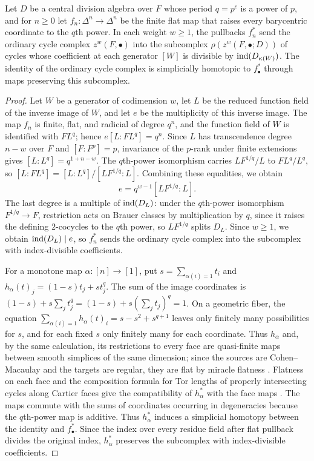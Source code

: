 \begin{lemma}\label{lem:app-frobenius-homotopy}
Let $D$ be a central division algebra over $F$ whose period $q=p^c$ is a power of $p$, and for $n\ge0$ let $f_n:\Delta^n\to\Delta^n$ be the finite flat map that raises every barycentric coordinate to the $q$th power.
In each weight $w\ge1$, the pullbacks $f_n^*$ send the ordinary cycle complex $z^w(F,\bullet)$ into the subcomplex $\rho(z^w(F,\bullet;D))$ of cycles whose coefficient at each generator $[W]$ is divisible by $\operatorname{ind}(D_{\kappa(W)})$.
The identity of the ordinary cycle complex is simplicially homotopic to $f_\bullet^*$ through maps preserving this subcomplex.
\end{lemma}
\begin{proof}
Let $W$ be a generator of codimension $w$, let $L$ be the reduced function field of the inverse image of $W$, and let $e$ be the multiplicity of this inverse image.
The map $f_n$ is finite, flat, and radicial of degree $q^n$, and the function field of $W$ is identified with $FL^q$; hence $e[L:FL^q]=q^n$.
Since $L$ has transcendence degree $n-w$ over $F$ and $[F:F^p]=p$, invariance of the $p$-rank under finite extensions gives $[L:L^q]=q^{1+n-w}$.
The $q$th-power isomorphism carries $LF^{1/q}/L$ to $FL^q/L^q$, so $[L:FL^q]=[L:L^q]/[LF^{1/q}:L]$.
Combining these equalities, we obtain
\[
 e=q^{w-1}[LF^{1/q}:L].
\]
The last degree is a multiple of $\operatorname{ind}(D_L)$: under the $q$th-power isomorphism $F^{1/q}\to F$, restriction acts on Brauer classes by multiplication by $q$, since it raises the defining $2$-cocycles to the $q$th power, so $LF^{1/q}$ splits $D_L$.
Since $w\ge1$, we obtain $\operatorname{ind}(D_L)\mid e$, so $f_n^*$ sends the ordinary cycle complex into the subcomplex with index-divisible coefficients.

For a monotone map $\alpha:[n]\to[1]$, put $s=\sum_{\alpha(i)=1}t_i$ and $h_\alpha(t)_j=(1-s)t_j+st_j^q$.
The sum of the image coordinates is $(1-s)+s\sum_jt_j^q=(1-s)+s(\sum_jt_j)^q=1$.
On a geometric fiber, the equation $\sum_{\alpha(i)=1}h_\alpha(t)_i=s-s^2+s^{q+1}$ leaves only finitely many possibilities for $s$, and for each fixed $s$ only finitely many for each coordinate.
Thus $h_\alpha$ and, by the same calculation, its restrictions to every face are quasi-finite maps between smooth simplices of the same dimension; since the sources are Cohen--Macaulay and the targets are regular, they are flat by miracle flatness \cite[Tag 00R4]{StacksProject}.
Flatness on each face and the composition formula for Tor lengths of properly intersecting cycles along Cartier faces give the compatibility of $h_\alpha^*$ with the face maps \cite[\S\S5.6, 5.9]{KahnLevine2010}.
The maps commute with the sums of coordinates occurring in degeneracies because the $q$th-power map is additive.
Thus $h_\alpha^*$ induces a simplicial homotopy between the identity and $f_\bullet^*$.
Since the index over every residue field after flat pullback divides the original index, $h_\alpha^*$ preserves the subcomplex with index-divisible coefficients.
\end{proof}


